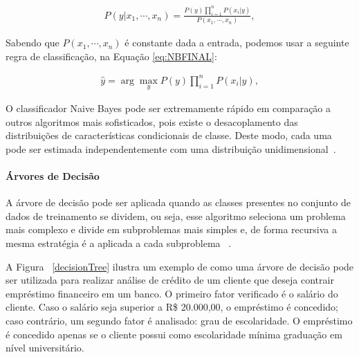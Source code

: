         \begin{equation}\label{eq:BayesSimples}
          \begin{aligned}
            P(y|x_{1},\cdots, x_{n}) = \frac{P(y)\prod_{i=1}^{n}P(x_{i}|y)}{P(x_{1},\cdots, x_{n})},
        \end{aligned}
        \end{equation}


        Sabendo que $P(x_{1},\cdots, x_{n})$ é constante dada a entrada, podemos usar a seguinte regra de classificação, na Equação \ref{eq:NBFINAL}:
        
        \begin{equation}\label{eq:NBFINAL}
          \begin{aligned}
            \widehat{y} = \arg\max_{y} P(y)\prod_{i=1}^{n}P(x_{i}|y),
        \end{aligned}
        \end{equation}


        O classificador Naive Bayes pode ser extremamente rápido em comparação a outros algoritmos mais sofisticados, pois existe o desacoplamento
        das distribuições de características condicionais de classe. Deste modo, cada uma pode ser estimada independentemente
         com uma distribuição unidimensional~\cite{zhang2004optimality}.


        \paragraph{Árvores de Decisão}

          A árvore de decisão pode ser aplicada quando as classes presentes no conjunto de dados de treinamento se dividem, ou seja, esse algoritmo seleciona
          um problema mais complexo e divide em subproblemas mais simples e, de forma recursiva a mesma estratégia é a aplicada a cada subproblema ~\cite{coelhoanalise}.

          A Figura ~\ref{decisionTree} ilustra um exemplo de como uma árvore de decisão pode ser utilizada para realizar análise de crédito de um cliente que deseja contrair empréstimo financeiro
           em um banco. O primeiro fator verificado é o salário do cliente. Caso o salário seja superior a R\$ 20.000,00, o empréstimo é concedido; 
          caso contrário, um segundo fator é analisado: grau de escolaridade. O empréstimo é concedido apenas se o cliente possui como escolaridade mínima graduação
           em nível universitário.




